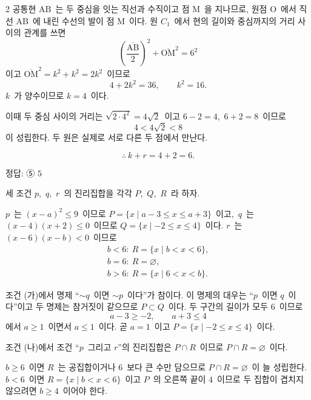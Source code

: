 \documentclass[10pt,fleqn]{article}
\begin{document}
\begin{multicols*}{2}
공통현 $\mathrm{AB}$\ 는 두 중심을 잇는 직선과 수직이고 점 $\mathrm{M}$\ 을 지나므로, 원점 $\mathrm{O}$\ 에서 직선 $\mathrm{AB}$\ 에 내린 수선의 발이 점 $\mathrm{M}$\ 이다. 원 $C_{1}$\ 에서 현의 길이와 중심까지의 거리 사이의 관계를 쓰면
$$\left(\dfrac{\overline{\mathrm{AB}}}{2}\right)^{2}+\overline{\mathrm{OM}}^{2}=6^{2}$$
이고 $\overline{\mathrm{OM}}^{2}=k^{2}+k^{2}=2k^{2}$\ 이므로
$$4+2k^{2}=36,\qquad k^{2}=16.$$
$k$\ 가 양수이므로 $k=4$\ 이다.

이때 두 중심 사이의 거리는 $\sqrt{2\cdot 4^{2}}=4\sqrt{2}$\ 이고 $6-2=4$,\ $6+2=8$\ 이므로
$$4<4\sqrt{2}<8$$
이 성립한다. 두 원은 실제로 서로 다른 두 점에서 만난다.

$$\therefore\ k+r=4+2=6.$$

\begin{dmanswerbox}
정답: ⑤ $5$
\end{dmanswerbox}

세 조건 $p$,\ $q$,\ $r$\ 의 진리집합을 각각 $P$,\ $Q$,\ $R$\ 라 하자.

$p$\ 는 $(x-a)^{2}\le 9$\ 이므로 $P=\{x\mid a-3\le x\le a+3\}$\ 이고,\ $q$\ 는 $(x-4)(x+2)\le 0$\ 이므로 $Q=\{x\mid -2\le x\le 4\}$\ 이다. $r$\ 는 $(x-6)(x-b)<0$\ 이므로
\begin{gather*}
b<6:\ R=\{x\mid b<x<6\},\\
b=6:\ R=\varnothing,\\
b>6:\ R=\{x\mid 6<x<b\}.
\end{gather*}

조건 (가)에서 명제 ``$\sim q$\ 이면 $\sim p$\ 이다''가 참이다. 이 명제의 대우는 ``$p$\ 이면 $q$\ 이다''이고 두 명제는 참거짓이 같으므로 $P\subset Q$\ 이다. 두 구간의 길이가 모두 $6$\ 이므로
$$a-3\ge -2,\qquad a+3\le 4$$
에서 $a\ge 1$\ 이면서 $a\le 1$\ 이다. 곧 $a=1$\ 이고 $P=\{x\mid -2\le x\le 4\}$\ 이다.

조건 (나)에서 조건 ``$p$\ 그리고 $r$''의 진리집합은 $P\cap R$\ 이므로 $P\cap R=\varnothing$\ 이다.

$b\ge 6$\ 이면 $R$\ 는 공집합이거나 $6$\ 보다 큰 수만 담으므로 $P\cap R=\varnothing$\ 이 늘 성립한다. $b<6$\ 이면 $R=\{x\mid b<x<6\}$\ 이고 $P$\ 의 오른쪽 끝이 $4$\ 이므로 두 집합이 겹치지 않으려면 $b\ge 4$\ 이어야 한다.


\end{multicols*}
\end{document}
